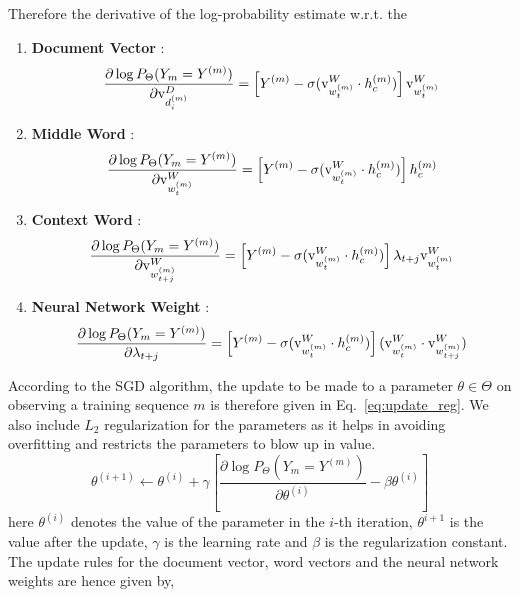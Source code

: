 Therefore the derivative of the log-probability estimate w.r.t. the 
\begin{enumerate}
\item
\textbf{Document Vector} : 
\begin{equation}
\label{eq:grad_doc}
\frac{\partial \log P_{\Theta}(Y_{m}=Y^{(m)})} {\partial \mathrm{v}^{D}_{d^{(m)}_{i}}} = \left[ Y^{(m)} - \sigma(\mathrm{v}^{W}_{w^{(m)}_{t}} \cdot h^{(m)}_{c})\right] \mathrm{v}^{W}_{w^{(m)}_{t}}
\end{equation}
\item 
\textbf{Middle Word} : 
\begin{equation}
\label{eq:grad_mword}
\frac{\partial \log P_{\Theta}(Y_{m}=Y^{(m)})} {\partial \mathrm{v}^{W}_{w^{(m)}_{t}}} = \left[ Y^{(m)} - \sigma(\mathrm{v}^{W}_{w^{(m)}_{t}} \cdot h^{(m)}_{c})\right] h^{(m)}_{c}
\end{equation}
\item 
\textbf{Context Word} : 
\begin{equation}
\label{eq:grad_cword}
\frac{\partial \log P_{\Theta}(Y_{m}=Y^{(m)})} {\partial \mathrm{v}^{W}_{w^{(m)}_{t+j}}} = \left[ Y^{(m)} - \sigma(\mathrm{v}^{W}_{w^{(m)}_{t}} \cdot h^{(m)}_{c})\right] \lambda_{t+j} \mathrm{v}^{W}_{w^{(m)}_{t}}
\end{equation}
\item 
\textbf{Neural Network Weight} : 
\begin{equation}
\label{eq:grad_wgt}
\frac{\partial \log P_{\Theta}(Y_{m}=Y^{(m)})} {\partial \lambda_{t+j}} = \left[ Y^{(m)} - \sigma(\mathrm{v}^{W}_{w^{(m)}_{t}} \cdot h^{(m)}_{c})\right] (\mathrm{v}^{W}_{w^{(m)}_{t}} \cdot \mathrm{v}^{W}_{w^{(m)}_{t+j}})
\end{equation}
\end{enumerate}
According to the SGD algorithm, the update to be made to a parameter $\theta \in \Theta$ on observing a training sequence $m$ is therefore given in Eq.~\ref{eq:update_reg}. We also include $L_{2}$ regularization for the parameters as it helps in avoiding overfitting and restricts the  parameters to  blow up in value.
\begin{equation}
\label{eq:update_reg}
\theta^{(i+1)} \leftarrow \theta^{(i)} + \gamma \left[\frac{\partial \log P_{\Theta}(Y_{m} = Y^{(m)})}{\partial \theta^{(i)}} - \beta \theta^{(i)} \right]
\end{equation}
here $\theta^{(i)}$ denotes the value of the parameter in the $i$-th iteration, $\theta^{i+1}$ is the value after the update, $\gamma$ is the learning rate and $\beta$ is the regularization constant.
The update rules for the document vector, word vectors and the neural network weights are hence given by,
